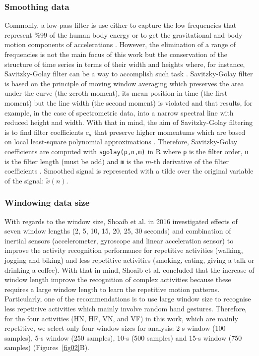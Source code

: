 \documentclass[fleqn,10pt]{wlscirep}
\begin{document}
\subsubsection*{Smoothing data}
Commonly, a low-pass filter is use either to capture the low frequencies that represent \%99 of the human body energy or to get the gravitational and body motion components of accelerations \cite{anguita2013}.
However, the elimination of a range of frequencies is not the main focus of this work but the conservation of the structure of time series in terms of their width and heights where, for instance, Savitzky-Golay filter can be a way to accomplish such task \cite{press1992}.
Savitzky-Golay filter is based on the principle of moving window averaging which preserves the area under the curve (the zeroth moment), its mean position in time (the first moment) but the line width (the second moment) is violated and that results, for example, in the case of spectrometric data, into a narrow spectral line with reduced height and width.
With that in mind, the aim of Savitzky-Golay filtering is to find filter coefficients $c_n$ that preserve higher momentums which are based on local least-square polynomial approximations \cite{savitzkygolay1964, press1992, schafer2011}.
Therefore, Savitzky-Golay coefficients are computed with \texttt{sgolay(p,n,m)} in R where \texttt{p} is the filter order, \texttt{n} is the filter length (must be odd) and \texttt{m} is the $m$-th derivative of the filter coefficients \cite{Rsignal}.
Smoothed signal is represented with a tilde over the original variable of the signal: $\tilde{x}(n)$.

\subsubsection*{Windowing data size}
With regards to the window size, Shoaib et al. in 2016 \cite{shoaib2016} investigated effects of seven window lengths (2, 5, 10, 15, 20, 25, 30 seconds) and combination of inertial sensors (accelerometer, gyroscope and linear
acceleration sensor) to improve the activity recognition performance for repetitive activities (walking, jogging and biking) and less repetitive activities (smoking, eating, giving a talk or drinking a coffee).
With that in mind, Shoaib et al. \cite{shoaib2016} concluded that the increase of window length improve the recognition of complex activities because these requires a large window length to learn the repetitive motion patterns.
Particularly, one of the recommendations is to use large window size to recognise less repetitive activities which mainly involve random hand gestures.
Therefore, for the four activities (HN, HF, VN, and VF) in this work, which are mainly repetitive, we select only four window sizes for analysis: 2-s window (100 samples), 5-s window (250 samples), 10-s (500 samples) and 15-s window (750 samples) (Figures~\ref{fig02}B).
\end{document}
